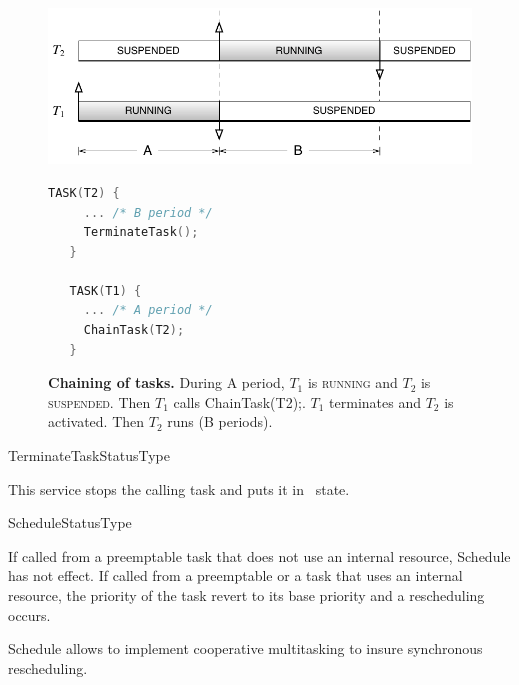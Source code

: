 \begin{figure}[htbp] %
   \centering
   \begin{minipage}[c]{.6\linewidth}
   \includegraphics[scale=.7]{pictures/schedulingChain.pdf}
   \end{minipage}\hfill
   \begin{minipage}[c]{.3\linewidth}
   \begin{lstlisting}[language=C]
   TASK(T2) {
     ... /* B period */
     TerminateTask();
   }
   
   TASK(T1) {
     ... /* A period */
     ChainTask(T2);
   }
 \end{lstlisting}
   \end{minipage}
   \caption{{\bfseries Chaining of tasks.} During A period, $T_1$ is {\sffamily\scshape running} and $T_2$ is {\sffamily\scshape suspended}. Then $T_1$ calls {\upshape\ttfamily ChainTask(T2);}. $T_1$ terminates and $T_2$ is activated. Then $T_2$ runs (B periods).}
   \label{fig:scheduleMultiple}
\end{figure} 

\begin{service}{TerminateTask}{StatusType}


This service stops the calling task and puts it in \SUSPENDED\ state.
\end{service}

\begin{service}{Schedule}{StatusType}

If called from a preemptable task that does not use an internal resource, Schedule has not effect. If called from a preemptable or a task that uses an internal resource, the priority of the task revert to its base priority and a rescheduling occurs.

Schedule allows to implement cooperative multitasking to insure synchronous rescheduling.
\end{service}

